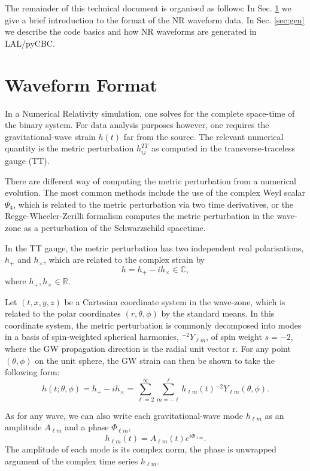 \documentclass[a4paper, 11pt]{article}
\begin{document}
The remainder of this technical document is organised as follows: In Sec. \ref{sec:format} we give a brief introduction
to the format of the NR waveform data. In Sec. \ref{sec:gen} we describe the code basics and how NR waveforms
are generated in LAL/pyCBC.

\section{Waveform Format}
\label{sec:format}
In a Numerical Relativity simulation, one solves for the complete space-time of the binary system. For data analysis
purposes however, one requires the gravitational-wave strain $h(t)$ far from the source. The relevant numerical quantity
is the metric perturbation $h^{TT}_{ij}$ as computed in the transverse-traceless gauge (TT). 

There are different way of computing the metric perturbation from a numerical evolution. The most common methods include
the use of the complex Weyl scalar $\Psi_4$, which is related to the metric perturbation via two time derivatives, or the
Regge-Wheeler-Zerilli formalism computes the metric perturbation in the wave-zone as a perturbation of the Schwarzschild
spacetime. 

In the TT gauge, the metric perturbation
has two independent real polarisations, $h_+$ and $h_\times$, which are related to the complex strain by
\begin{equation}
\label{ }
h = h_+ - i h_\times \in \mathbb{C},
\end{equation}
where $h_+, h_\times \in \mathbb{R}$.

Let $(t,x,y,z)$ be a Cartesian coordinate system in the wave-zone, which is related to the polar coordinates $(r, \theta, \phi)$ by the standard means. 
In this coordinate system, the metric perturbation is commonly decomposed into modes
in a basis of spin-weighted spherical harmonics, ${}^{-2}Y_{\ell m}$, of spin weight $s=-2$, where the GW propagation direction is
the radial unit vector r.
For any point $(\theta, \phi)$ on the unit sphere, the GW strain can then be shown to take the following form:
\begin{equation}
\label{ }
h(t; \theta, \phi) = h_+ - i h_\times = \sum_{\ell=2}^\infty \sum_{m=-\ell}^{\ell} h_{\ell m}(t) {}^{-2}Y_{\ell m}(\theta,\phi).
\end{equation}

As for any wave, we can also write each gravitational-wave mode $h_{\ell m}$ as an amplitude $A_{\ell m}$ and a phase
$\Phi_{\ell m}$,
\begin{equation}
\label{ }
h_{\ell m}(t) = A_{\ell m}(t)e^{i\Phi_{\ell m}}.
\end{equation}
The amplitude of each mode is its complex norm, the phase is unwrapped argument of the complex time series $h_{\ell m}$. 
\end{document}

